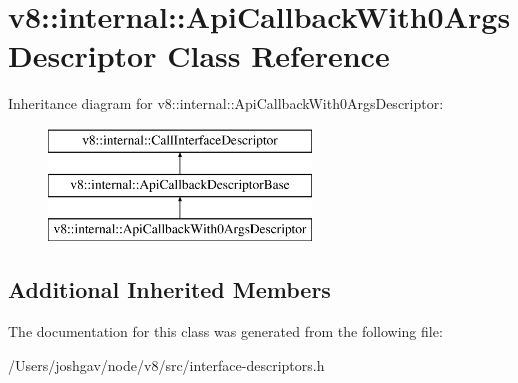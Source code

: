 \hypertarget{classv8_1_1internal_1_1_api_callback_with0_args_descriptor}{}\section{v8\+:\+:internal\+:\+:Api\+Callback\+With0\+Args\+Descriptor Class Reference}
\label{classv8_1_1internal_1_1_api_callback_with0_args_descriptor}
Inheritance diagram for v8\+:\+:internal\+:\+:Api\+Callback\+With0\+Args\+Descriptor\+:\begin{figure}[H]
\begin{center}
\leavevmode
\includegraphics[height=3.000000cm]{classv8_1_1internal_1_1_api_callback_with0_args_descriptor}
\end{center}
\end{figure}
\subsection*{Additional Inherited Members}


The documentation for this class was generated from the following file\+:\begin{DoxyCompactItemize}
\item 
/\+Users/joshgav/node/v8/src/interface-\/descriptors.\+h\end{DoxyCompactItemize}
